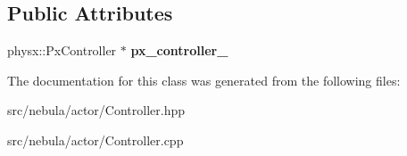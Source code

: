 \subsection*{Public Attributes}
\begin{DoxyCompactItemize}
\item 
\hypertarget{classneb_1_1actor_1_1Controller_af166ab349a8e62aa9f8f7c79a659e1f3}{
physx::PxController $\ast$ {\bfseries px\_\-controller\_\-}}
\label{classneb_1_1actor_1_1Controller_af166ab349a8e62aa9f8f7c79a659e1f3}

\end{DoxyCompactItemize}


The documentation for this class was generated from the following files:\begin{DoxyCompactItemize}
\item 
src/nebula/actor/Controller.hpp\item 
src/nebula/actor/Controller.cpp\end{DoxyCompactItemize}
